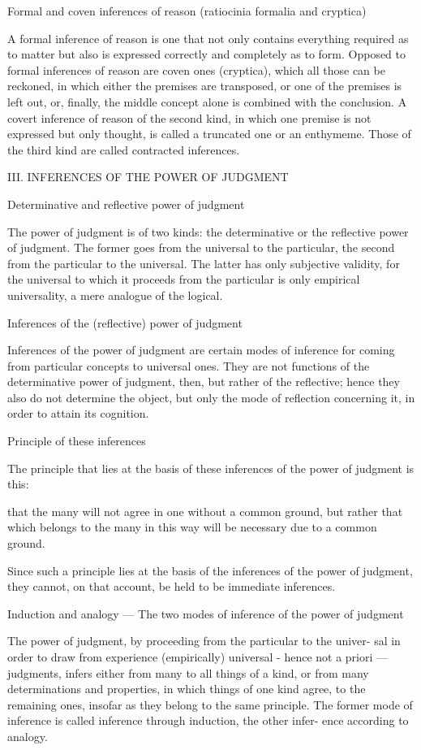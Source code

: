 Formal and coven inferences of reason (ratiocinia formalia and cryptica)

A formal inference of reason is one that not only contains everything required
as to matter but also is expressed correctly and completely as to form.
Opposed to formal inferences of reason are coven ones (cryptica),
which all those can be reckoned, in which
either the premises are transposed,
or one of the premises is left out, or, finally,
the middle concept alone is combined with the conclusion.
A covert inference of reason of the second kind,
in which one premise is not expressed but only thought, is called
a truncated one or an enthymeme.
Those of the third kind are called contracted inferences.

III. INFERENCES OF THE POWER OF JUDGMENT

Determinative and reflective power of judgment

The power of judgment is of two kinds:
the determinative or the reflective power of judgment.
The former goes from the universal to the particular,
the second from the particular to the universal.
The latter has only subjective validity,
for the universal to which it proceeds from the particular is
only empirical universality, a mere analogue of the logical.

Inferences of the (reflective) power of judgment

Inferences of the power of judgment are certain modes of inference for
coming from particular concepts to universal ones.
They are not functions of the determinative power of judgment,
then, but rather of the reflective;
hence they also do not determine the object,
but only the mode of reflection concerning it,
in order to attain its cognition.

Principle of these inferences

The principle that lies at the basis of these inferences of the
power of judgment is this:

that the many will not agree in one without a common ground,
but rather that which belongs to the many in this way will be
necessary due to a common ground.

    Since such a principle lies at the basis of
    the inferences of the power of judgment,
    they cannot, on that account, be held to be immediate inferences.

Induction and analogy — The two modes of inference of the power of judgment

The power of judgment, by proceeding from the particular to the univer-
sal in order to draw from experience (empirically) universal - hence not a
priori — judgments, infers either from many to all things of a kind, or from
many determinations and properties, in which things of one kind agree, to
the remaining ones, insofar as they belong to the same principle. The former
mode of inference is called inference through induction, the other infer-
ence according to analogy.

